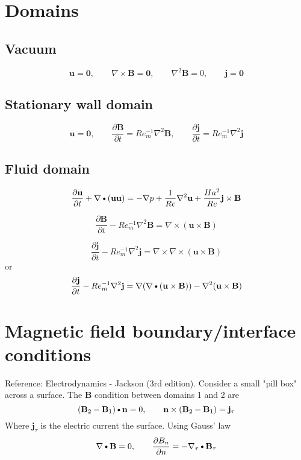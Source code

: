 \documentclass[11pt]{article}
\newcommand{\B}{\mathbf{B}}
\newcommand{\U}{\mathbf{u}}
\newcommand{\curl}{\nabla \times}
\newcommand{\PD}{\partial}
\newcommand{\J}{\mathbf{j}}
\newcommand{\N}{\mathbf{n}}
\newcommand{\DOT}{\text{\textbullet}}
\begin{document}
\section{Domains}

\subsection{Vacuum}
\begin{equation}
  \U = \mathbf{0}
  , \qquad
  \curl \B = \mathbf{0}
  , \qquad
  \nabla^2 \B = 0
  , \qquad
  \J = \mathbf{0}
\end{equation}
\subsection{Stationary wall domain}
\begin{equation}
  \U = \mathbf{0}
  , \qquad
  \frac{\PD \B}{\PD t} = Re_m^{-1} \nabla^2 \B
  , \qquad
  \frac{\PD \J}{\PD t} = Re_m^{-1} \nabla^2 \J
\end{equation}

\subsection{Fluid domain}
\begin{equation}
  \frac{\PD \U}{\PD t} + \nabla \DOT (\U \U)
  = - \nabla p + \frac{1}{Re} \nabla^2 \U 
  + \frac{Ha^2}{Re} \J \times \B
\end{equation}

\begin{equation}
  \frac{\PD \B}{\PD t} - 
  Re_m^{-1} \nabla^2 \B = 
  \curl (\U \times \B)
\end{equation}

\begin{equation}
  \frac{\PD \J}{\PD t} - Re_m^{-1} \nabla^2 \J = \curl \curl (\U \times \B)
\end{equation}
or
\begin{equation}
  \frac{\PD \J}{\PD t} - Re_m^{-1} \nabla^2 \J = \nabla (\nabla \DOT (\U \times \B)) - \nabla^2 (\U \times \B)
\end{equation}

\section{Magnetic field boundary/interface conditions}
Reference: Electrodynamics - Jackson (3rd edition). Consider a small "pill box" across a surface. The $\B$ condition between domains 1 and 2 are
\begin{equation}
  (\B_2 - \B_1)\DOT \N = 0
  , \qquad
  \N \times (\B_2 - \B_1) = \J_{\tau}
\end{equation}
Where $\J_{\tau}$ is the electric current the surface. Using Gauss' law
\begin{equation}
    \nabla \DOT \B = 0
    , \qquad
    \frac{\PD B_n}{\PD n} = - \nabla_{\tau} \DOT \B_{\tau}
\end{equation}
\end{document}
